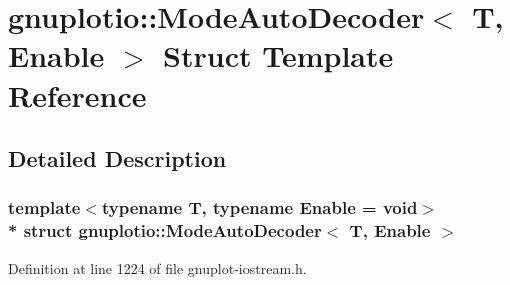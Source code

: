 \hypertarget{structgnuplotio_1_1_mode_auto_decoder}{}\section{gnuplotio\+:\+:Mode\+Auto\+Decoder$<$ T, Enable $>$ Struct Template Reference}
\label{structgnuplotio_1_1_mode_auto_decoder}


\subsection{Detailed Description}
\subsubsection*{template$<$typename T, typename Enable = void$>$\\*
struct gnuplotio\+::\+Mode\+Auto\+Decoder$<$ T, Enable $>$}



Definition at line 1224 of file gnuplot-\/iostream.\+h.

